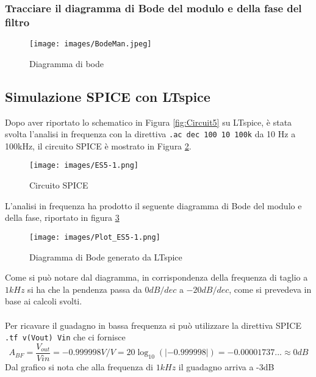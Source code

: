 \subsubsection{Tracciare il diagramma di Bode del modulo e della fase del filtro}
\begin{figure}[H]
    \centering
    \texttt{[image: images/BodeMan.jpeg]}
    \caption{Diagramma di bode}
    \label{fig:BodeMan}
\end{figure}
\clearpage
\subsection{Simulazione SPICE con LTspice\textregistered\xspace}
Dopo aver riportato lo schematico in Figura \ref{fig:Circuit5} su LTspice\textregistered\xspace, è stata svolta l'analisi in frequenza con la direttiva \texttt{.ac dec 100 10 100k} da 10 Hz a 100kHz, il circuito SPICE è mostrato in Figura \ref{fig:SpiceES5}.
\begin{figure}[H]
    \centering
    \texttt{[image: images/ES5-1.png]}
    \caption{Circuito SPICE}
    \label{fig:SpiceES5}
\end{figure}
L'analisi in frequenza ha prodotto il seguente diagramma di Bode del modulo e della fase, riportato in figura \ref{fig:SpiceBodeES5}
\begin{figure}[H]
    \centering
    \texttt{[image: images/Plot\_ES5-1.png]}
    \caption{Diagramma di Bode generato da LTspice\textregistered}
    \label{fig:SpiceBodeES5}
\end{figure}
Come si può notare dal diagramma, in corrispondenza della frequenza di taglio a $1kHz$ si ha che la pendenza passa da $0dB/dec$ a $-20dB/dec$, come si prevedeva in base ai calcoli svolti.\\\\
Per ricavare il guadagno in bassa frequenza si può utilizzare la direttiva SPICE \texttt{.tf v(Vout) Vin} che ci fornisce 
\begin{equation}
    A_{BF}=\frac{V_{out}}{Vin}=-0.999998 V/V = 20\log_{10}{(\left|-0.999998\right|)}=-0.00001737...\approx0dB
\end{equation}
Dal grafico si nota che alla frequenza di $1kHz$ il guadagno arriva a -3dB
